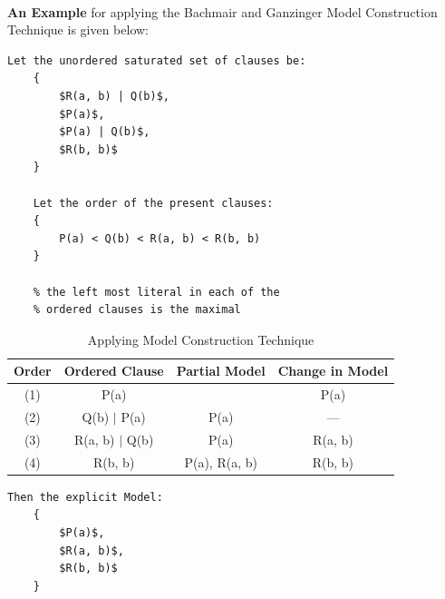 \begin{algorithm}[H]
\begin{algorithmic}[1]

				\end{algorithmic}
			\end{algorithm}

		
		
		\paragraph{}
		\textbf{An Example} for applying the Bachmair and Ganzinger Model Construction Technique is given below:

			\begin{minipage}{\textwidth}
			\begin{lstlisting}[caption=Example for applying Bachmair and Ganzinger Model Construction Technique (SETUP),frame=single,mathescape]
	Let the unordered saturated set of clauses be:
	{
		$R(a, b) | Q(b)$,
		$P(a)$,
		$P(a) | Q(b)$,
		$R(b, b)$
	}
	
	Let the order of the present clauses:
	{
		P(a) < Q(b) < R(a, b) < R(b, b)
	}			

	% the left most literal in each of the
	% ordered clauses is the maximal
		\end{lstlisting}	
	
\begin{table}[H]
		\centering
		\begin{tabular}{||c | c | c | c||}
		\toprule		
		Order & Ordered Clause & Partial Model & Change in Model \\ [0.5ex] 
		\midrule
 		(1) & P(a) 			& {} 				& P(a) \\ 
 		(2) & Q(b) $\vert$ P(a)  	& {P(a)} 			& --- \\
 		(3) & R(a, b) $\vert$ Q(b)	& {P(a)}		 		& R(a, b) \\
 		(4) & R(b, b) 		& {P(a), R(a, b)} 	& R(b, b) \\ [1ex]
		\bottomrule		
		\end{tabular}
		\caption{Applying Model Construction Technique}
		\label{table:app_model}
\end{table}

		
			\begin{lstlisting}[caption=Example for applying Bachmair and Ganzinger Model Construction Technique (OUTPUT),frame=single,mathescape]
	Then the explicit Model:
	{
		$P(a)$,
		$R(a, b)$,
		$R(b, b)$	
	}		
			\end{lstlisting}
			\end{minipage}
		
